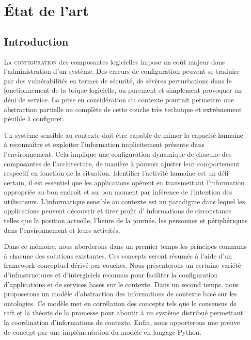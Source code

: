 \chapter{État de l'art}

\section{Introduction}

\lettrine{L}{a configuration} des composantes logicielles impose un coût majeur
dans l'administration d'un système. Des erreurs de configuration peuvent se
traduire par des vulnérabilités en termes de sécurité, de sévères perturbations
dans le fonctionnement de la brique logicielle, ou purement et simplement
provoquer un déni de service. La prise en considération du contexte pourrait
permettre une abstraction partielle ou complète de cette couche très technique
et extrêmement pénible à configurer.

Un système sensible au contexte doit être capable de mimer la capacité humaine à
reconnaître et exploiter l'information implicitement présente dans
l'environnement. Cela implique une configuration dynamique de chacune des
composantes de l'architecture, de manière à pouvoir ajuster leur comportement
respectif en fonction de la situation. Identifier l'activité humaine est un
défi certain, il est essentiel que les applications opèrent en transmettant
l'information appropriée au bon endroit et au bon moment par inférence de
l'intention des utilisateurs. L'informatique sensible au contexte est un
paradigme dans lequel les applications peuvent découvrir et tirer profit d'
informations de circonstance telles que la position actuelle, l'heure de la
journée, les personnes et périphériques dans l'environnement et leurs activités.

Dans ce mémoire, nous aborderons dans un premier temps les principes communs à
chacune des solutions existantes. Ces concepts seront résumés à l'aide d'un
framework conceptuel dérivé par couches. Nous présenterons un certaine variété
d'infrastructures et d'intergiciels reconnus pour faciliter la configuration
d'applications et de services basés sur le contexte. Dans un second temps, nous
proposerons un modèle d'abstraction des informations de contexte basé sur les
ontologies. Ce modèle met en corrélation des concepts tels que le consensus de
raft et la théorie de la promesse pour aboutir à un système distribué permettant
la coordination d'informations de contexte. Enfin, nous apporterons une preuve de
concept par une implémentation du modèle en langage Python.

